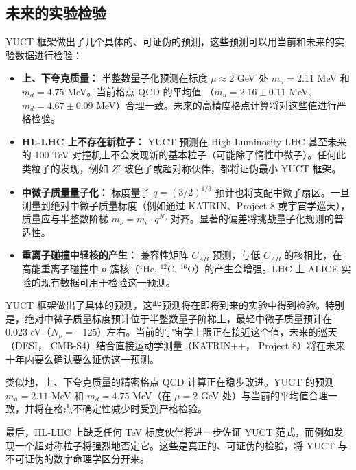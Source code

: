 \documentclass[11pt,a4paper]{article}
\begin{document}
	\subsection{未来的实验检验}
	
	YUCT 框架做出了几个具体的、可证伪的预测，这些预测可以用当前和未来的实验数据进行检验：
	
	\begin{itemize}
		\item \textbf{上、下夸克质量：} 半整数量子化预测在标度 $\mu \approx 2$ GeV 处 $m_u = 2.11$ MeV 和 $m_d = 4.75$ MeV。当前格点 QCD 的平均值 \cite{PDG2024}（$m_u = 2.16 \pm 0.11$ MeV, $m_d = 4.67 \pm 0.09$ MeV）合理一致。未来的高精度格点计算将对这些值进行严格检验。
		
		\item \textbf{HL-LHC 上不存在新粒子：} YUCT 预测在 High-Luminosity LHC 甚至未来的 100 TeV 对撞机上不会发现新的基本粒子（可能除了惰性中微子）。任何此类粒子的发现，例如 $Z'$ 玻色子或超对称伙伴，都将证伪最小 YUCT 框架。
		
		\item \textbf{中微子质量量子化：} 标度量子 $q = (3/2)^{1/3}$ 预计也将支配中微子扇区。一旦测量到绝对中微子质量标度（例如通过 KATRIN、Project 8 或宇宙学巡天），质量应与半整数阶梯 $m_\nu = m_e \cdot q^{N_\nu}$ 对齐。显著的偏差将挑战量子化规则的普适性。
		
		\item \textbf{重离子碰撞中轻核的产生：} 兼容性矩阵 $C_{AB}$ 预测，与低 $C_{AB}$ 的核相比，在高能重离子碰撞中 α-簇核（$^4$He, $^{12}$C, $^{16}$O）的产生会增强。LHC 上 ALICE 实验的现有数据可用于检验这一预测。
	\end{itemize}
	
	YUCT 框架做出了具体的预测，这些预测将在即将到来的实验中得到检验。特别是，绝对中微子质量标度预计位于半整数量子阶梯上，最轻中微子质量预计在 $0.023$ eV（$N_\nu = -125$）左右。当前的宇宙学上限正在接近这个值，未来的巡天（DESI， CMB‑S4）结合直接运动学测量（KATRIN++， Project 8）将在未来十年内要么确认要么证伪这一预测。
	
	类似地，上、下夸克质量的精密格点 QCD 计算正在稳步改进。YUCT 的预测 $m_u = 2.11$ MeV 和 $m_d = 4.75$ MeV（在 $\mu = 2$ GeV 处）与当前的平均值合理一致，并将在格点不确定性减少时受到严格检验。
	
	最后，HL‑LHC 上缺乏任何 TeV 标度伙伴将进一步佐证 YUCT 范式，而例如发现一个超对称粒子将强烈地否定它。这些是真正的、可证伪的检验，将 YUCT 与不可证伪的数字命理学区分开来。
	
\end{document}
